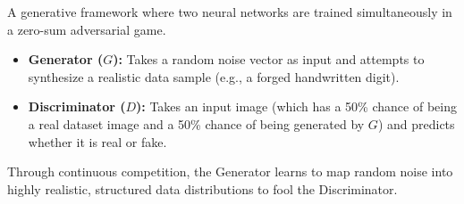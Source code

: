 \begin{definition}
A generative framework where two neural networks are trained simultaneously in a zero-sum adversarial game.
\begin{itemize}
    \item \textbf{Generator ($G$):} Takes a random noise vector as input and attempts to synthesize a realistic data sample (e.g., a forged handwritten digit).
    \item \textbf{Discriminator ($D$):} Takes an input image (which has a 50\% chance of being a real dataset image and a 50\% chance of being generated by $G$) and predicts whether it is real or fake.
\end{itemize}
Through continuous competition, the Generator learns to map random noise into highly realistic, structured data distributions to fool the Discriminator.
\end{definition}
